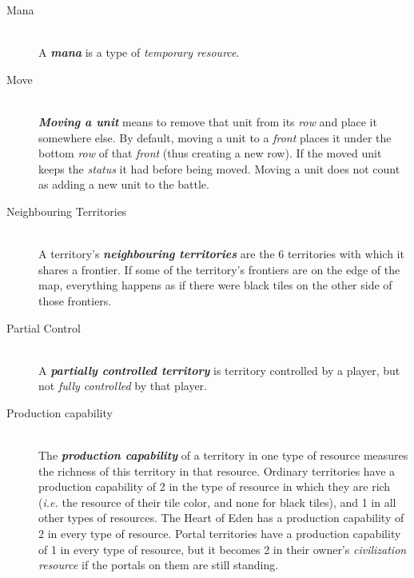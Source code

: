 \documentclass[a4paper]{article}
\begin{document}
\begin{description}
        \item[Mana] \hfill \\
            A \textbf{\textit{mana}} is a type of \textit{temporary resource}.
            
        \item[Move] \hfill \\
            \textbf{\textit{Moving a unit}} means to remove that unit from its
            \textit{row} and place it somewhere else.
            By default, moving a unit to a \textit{front} places it
            under the bottom \textit{row} of that \textit{front}
            (thus creating a new row).
            If the moved unit keeps the \textit{status} it had before being moved.
            Moving a unit does not count as adding a new unit to the battle.
            
        \item[Neighbouring Territories] \hfill \\
            A territory's \textbf{\textit{neighbouring territories}} are the 6 territories
            with which it shares a frontier.
            If some of the territory's frontiers are on the edge of the map,
            everything happens as if there were black tiles
            on the other side of those frontiers.
            
        \item[Partial Control] \hfill \\
            A \textbf{\textit{partially controlled territory}} is territory controlled
            by a player, but not \textit{fully controlled} by that player.
            
        \item[Production capability] \hfill \\
            The \textbf{\textit{production capability}} of a territory in one type
            of resource measures the richness of this territory in that resource.
            Ordinary territories have a production capability of 2 in the type of resource
            in which they are rich (\textit{i.e.} the resource of their tile color,
            and none for black tiles), and 1 in all other types of resources.
            The Heart of Eden has a production capability of 2 in every type
            of resource.
            Portal territories have a production capability of 1 in every type of resource,
            but it becomes 2 in their owner's \textit{civilization resource}
            if the portals on them are still standing.
            

\end{description}
\end{document}
